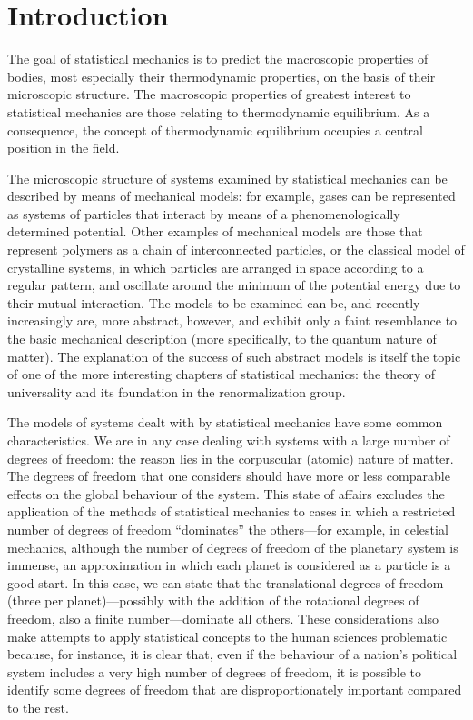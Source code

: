 \documentclass[11pt, a4paper, twoside, openright]{book}
\begin{document}

\frontmatter


\tableofcontents


\pagestyle{plain}

\chapter{Introduction}

The goal of statistical mechanics is to predict the macroscopic properties of bodies, most especially their thermodynamic properties, on the basis of their microscopic structure.
The macroscopic properties of greatest interest to statistical mechanics are those relating to thermodynamic equilibrium. As a consequence, the concept of thermodynamic equilibrium occupies a central position in the field. 

The microscopic structure of systems examined by statistical mechanics can be described by means of mechanical models: for example, gases can be represented as systems of particles that interact by means of a phenomenologically determined potential. Other examples of mechanical models are those that represent polymers as a chain of interconnected particles, or the classical model of crystalline systems, in which particles are arranged in space according to a regular pattern, and oscillate around the minimum of the potential energy due to their mutual interaction. The models to be examined can be, and recently increasingly are, more abstract, however, and exhibit only a faint resemblance to the basic mechanical description (more specifically, to the quantum nature of matter). The explanation of the success of such abstract models is itself the topic of one of the more interesting chapters of statistical mechanics: the theory of universality and its foundation in the renormalization group.

The models of systems dealt with by statistical mechanics have some common characteristics. We are in any case dealing with systems with a large number of degrees of freedom:  the reason lies in the corpuscular (atomic) nature of matter.
The degrees of freedom that one considers should have more or less comparable effects on the global behaviour of the system.  This state of affairs excludes the application of the methods of statistical mechanics to cases in which a restricted number of degrees of freedom “dominates” the others—for example, in celestial mechanics, although the number of degrees of freedom of the planetary system is immense, an approximation in which each planet is considered as a particle is a good start. In this case, we can state that the translational degrees of freedom (three per planet)—possibly with the addition of the rotational degrees of freedom, also a finite number—dominate all others.
These considerations also make attempts to apply statistical concepts to the human sciences problematic because, for instance, it is clear that, even if the behaviour of a nation’s political system includes a very high number of degrees of freedom, it is possible to identify some degrees of freedom that are disproportionately important compared to the rest.
\end{document}
